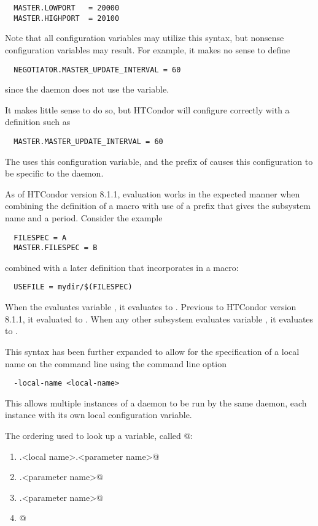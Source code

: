 \begin{verbatim}
  MASTER.LOWPORT   = 20000
  MASTER.HIGHPORT  = 20100
\end{verbatim}

Note that all configuration variables may utilize this syntax,
but nonsense configuration variables may result.
For example, it makes no sense to define
\begin{verbatim}
  NEGOTIATOR.MASTER_UPDATE_INTERVAL = 60
\end{verbatim}
since the  daemon does not use the
 variable.

It makes little sense to do so, but HTCondor will configure
correctly with a definition such as
\begin{verbatim}
  MASTER.MASTER_UPDATE_INTERVAL = 60
\end{verbatim}
The  uses this configuration variable,
and the prefix of  causes this configuration
to be specific to the  daemon.

As of HTCondor version 8.1.1, evaluation works in the expected manner
when combining the definition of a macro with
use of a prefix that gives the subsystem name and a period. 
Consider the example
\begin{verbatim}
  FILESPEC = A
  MASTER.FILESPEC = B 
\end{verbatim}
combined with a later definition that incorporates 
in a macro:
\begin{verbatim}
  USEFILE = mydir/$(FILESPEC)
\end{verbatim}
When the  evaluates variable ,
it evaluates to . 
Previous to HTCondor version 8.1.1, it evaluated to .
When any other subsystem evaluates variable ,
it evaluates to .

This syntax has been further expanded to allow for the
specification of a local name on the command line 
using the command line option
\begin{verbatim}
  -local-name <local-name>
\end{verbatim}
This allows multiple instances of a daemon to be run 
by the same  daemon,
each instance with its own local configuration variable.

The ordering used to look up a variable, called @:

\begin{enumerate}
\item {}.<local name>.<parameter name>@

\item {}.<parameter name>@

\item {}.<parameter name>@

\item {}@
\end{enumerate}


